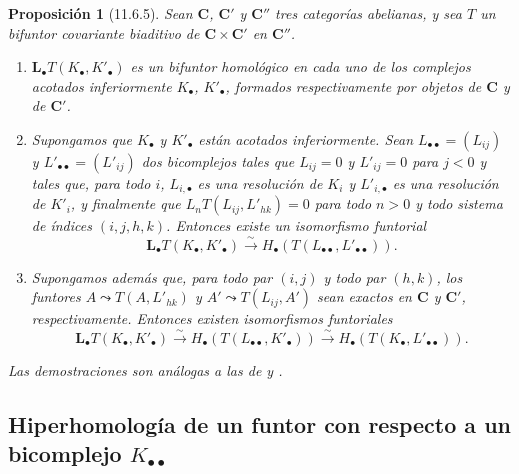 \documentclass[10pt,oneside,openany]{book}
\theoremstyle{egaenv}\newtheorem*{env}{---}
\theoremstyle{egastatement}
\newtheorem*{proposition}{Proposición}
\theoremstyle{egadescription}
\begin{document}
\begin{proposition}[11.6.5]
\label{0.11.6.5}
\label{0.11.6.5-fr}
Sean $\boldsymbol{C}$, $\boldsymbol{C}'$ y $\boldsymbol{C}''$ tres categorías abelianas, y sea $T$ un bifuntor covariante biaditivo de $\boldsymbol{C}\times\boldsymbol{C}'$ en $\boldsymbol{C}''$.
\begin{enumerate}
  \item[{\rm(i)}] {$\mathbf{L}_\bullet T(K_\bullet,K'_\bullet)$ es un bifuntor homológico en cada uno de los complejos acotados inferiormente $K_\bullet$, $K'_\bullet$, formados respectivamente por objetos de $\boldsymbol{C}$ y de $\boldsymbol{C}'$.}

  \item[{\rm(ii)}] {Supongamos que $K_\bullet$ y $K'_\bullet$ están acotados inferiormente.
  Sean $L_{\bullet\bullet}=(L_{ij})$ y $L'_{\bullet\bullet}=(L'_{ij})$ dos bicomplejos tales que $L_{ij}=0$ y $L'_{ij}=0$ para $j<0$ y tales que, para todo $i$, $L_{i,\bullet}$ es una resolución de $K_i$ y $L'_{i,\bullet}$ es una resolución de $K'_i$, y finalmente que $L_nT(L_{ij},L'_{hk})=0$ para todo $n>0$ y todo sistema de índices $(i,j,h,k)$.
  Entonces existe un isomorfismo funtorial}
  \[
\label{0.11.6.5.1-fr}
\tag{11.6.5.1}
\mathbf{L}_\bullet T(K_\bullet,K'_\bullet)
\xrightarrow{\sim} H_\bullet(T(L_{\bullet\bullet},L'_{\bullet\bullet})).
\]

  \item[{\rm(iii)}] {Supongamos además que, para todo par $(i,j)$ y todo par $(h,k)$, los funtores $A\leadsto T(A,L'_{hk})$ y $A'\leadsto T(L_{ij},A')$ sean exactos en $\boldsymbol{C}$ y $\boldsymbol{C}'$, respectivamente.
  Entonces existen isomorfismos funtoriales}
  \[
\label{0.11.6.5.2-fr}
\tag{11.6.5.2}
\mathbf{L}_\bullet T(K_\bullet,K'_\bullet)
\xrightarrow{\sim} H_\bullet(T(L_{\bullet\bullet},K'_\bullet))
\xrightarrow{\sim} H_\bullet(T(K_\bullet,L'_{\bullet\bullet})).
\]
\end{enumerate}

\upshape Las demostraciones son análogas a las de  y .
\end{proposition}

\subsection{Hiperhomología de un funtor con respecto a un bicomplejo $K_{\bullet\bullet}$}
\label{subsection:0.11.7}
\label{subsection:0.11.7-fr}
\end{document}
